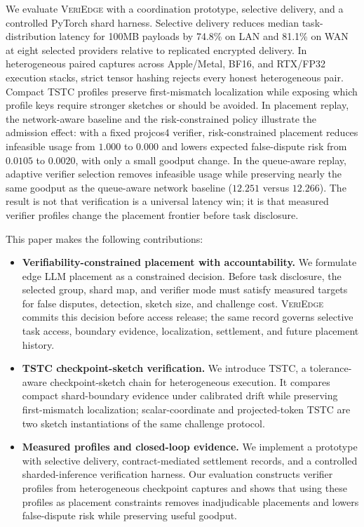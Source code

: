 \documentclass[sigplan,screen,review,anonymous]{acmart}
\newcommand{\system}{\textsc{VeriEdge}\xspace}
\begin{document}
We evaluate \system with a coordination prototype, selective delivery, and a
controlled PyTorch shard harness. Selective delivery reduces median
task-distribution latency for 100MB payloads by 74.8\% on LAN and 81.1\% on
WAN at eight selected providers relative to replicated encrypted delivery. In heterogeneous paired
captures across Apple/\allowbreak Metal, BF16, and RTX/\allowbreak FP32
execution stacks, strict tensor hashing rejects every honest heterogeneous
pair. Compact TSTC profiles preserve first-mismatch localization while
exposing which profile keys require stronger sketches or should be avoided.
In placement replay, the network-aware baseline and the risk-constrained
policy illustrate the admission effect: with a fixed projcos4 verifier,
risk-constrained placement reduces infeasible usage from \(1.000\) to
\(0.000\) and lowers expected false-dispute risk from \(0.0105\) to
\(0.0020\), with only a small goodput change. In the queue-aware replay,
adaptive verifier selection removes infeasible usage while preserving nearly
the same goodput as the queue-aware network baseline (\(12.251\) versus
\(12.266\)). The result is not that verification is a universal latency win;
it is that measured verifier profiles change the placement frontier before
task disclosure.

This paper makes the following contributions:
\begin{itemize}[leftmargin=1.5em]
	\item \textbf{Verifiability-constrained placement with accountability.}
	We formulate edge LLM placement as a constrained decision. Before task
	disclosure, the selected group, shard map, and verifier mode must satisfy
	measured targets for false disputes, detection, sketch size, and challenge
	cost. \system commits this decision before access release; the same record
	governs selective task access, boundary evidence, localization, settlement,
	and future placement history.
	
	\item \textbf{TSTC checkpoint-sketch verification.}
	We introduce TSTC, a tolerance-aware checkpoint-sketch chain for
	heterogeneous execution. It compares compact shard-boundary evidence under
	calibrated drift while preserving first-mismatch localization; scalar-coordinate
	and projected-token TSTC are two sketch instantiations of the same challenge
	protocol.
	
	\item \textbf{Measured profiles and closed-loop evidence.}
	We implement a prototype with selective delivery, contract-mediated
	settlement records, and a controlled sharded-inference verification
	harness. Our evaluation constructs verifier profiles from heterogeneous
	checkpoint captures and shows that using these profiles as placement
	constraints removes inadjudicable placements and lowers false-dispute risk
	while preserving useful goodput.
\end{itemize}
\end{document}
